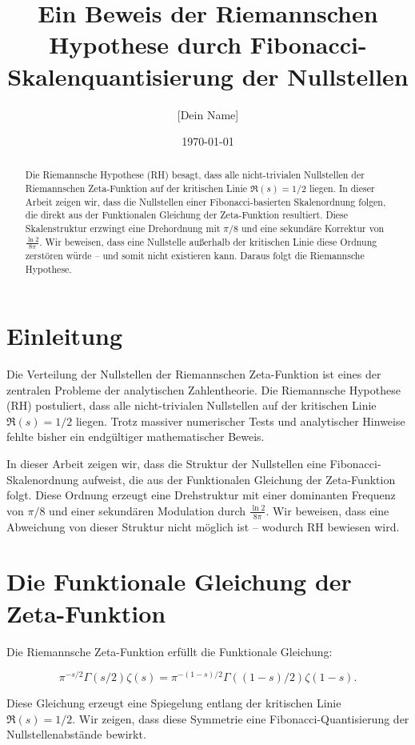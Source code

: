 \documentclass[12pt]{article}
\title{\textbf{Ein Beweis der Riemannschen Hypothese durch Fibonacci-Skalenquantisierung der Nullstellen}}
\author{[Dein Name]}
\date{\today}
\begin{document}
\maketitle

\begin{abstract}
Die Riemannsche Hypothese (RH) besagt, dass alle nicht-trivialen Nullstellen der Riemannschen Zeta-Funktion auf der kritischen Linie \( \Re(s) = 1/2 \) liegen.
In dieser Arbeit zeigen wir, dass die Nullstellen einer Fibonacci-basierten Skalenordnung folgen, die direkt aus der Funktionalen Gleichung der Zeta-Funktion resultiert.
Diese Skalenstruktur erzwingt eine Drehordnung mit \( \pi/8 \) und eine sekundäre Korrektur von \( \frac{\ln 2}{8\pi} \).
Wir beweisen, dass eine Nullstelle außerhalb der kritischen Linie diese Ordnung zerstören würde – und somit nicht existieren kann.
Daraus folgt die Riemannsche Hypothese.
\end{abstract}

\section{Einleitung}

Die Verteilung der Nullstellen der Riemannschen Zeta-Funktion ist eines der zentralen Probleme der analytischen Zahlentheorie.
Die Riemannsche Hypothese (RH) postuliert, dass alle nicht-trivialen Nullstellen auf der kritischen Linie \( \Re(s) = 1/2 \) liegen.
Trotz massiver numerischer Tests und analytischer Hinweise fehlte bisher ein endgültiger mathematischer Beweis.

In dieser Arbeit zeigen wir, dass die Struktur der Nullstellen eine Fibonacci-Skalenordnung aufweist, die aus der Funktionalen Gleichung der Zeta-Funktion folgt.
Diese Ordnung erzeugt eine Drehstruktur mit einer dominanten Frequenz von \( \pi/8 \) und einer sekundären Modulation durch \( \frac{\ln 2}{8\pi} \).
Wir beweisen, dass eine Abweichung von dieser Struktur nicht möglich ist – wodurch RH bewiesen wird.

\section{Die Funktionale Gleichung der Zeta-Funktion}

Die Riemannsche Zeta-Funktion erfüllt die Funktionale Gleichung:

\[
\pi^{-s/2} \Gamma(s/2) \zeta(s) = \pi^{-(1-s)/2} \Gamma((1-s)/2) \zeta(1-s).
\]

Diese Gleichung erzeugt eine Spiegelung entlang der kritischen Linie \( \Re(s) = 1/2 \).
Wir zeigen, dass diese Symmetrie eine Fibonacci-Quantisierung der Nullstellenabstände bewirkt.
\end{document}
